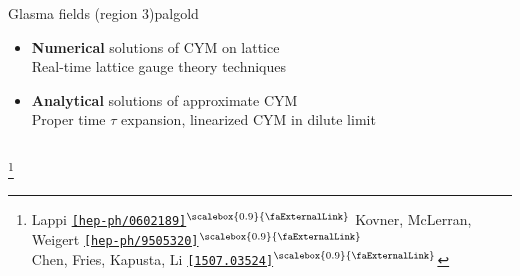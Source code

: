 \documentclass[aspectratio=169,11pt,usenames,dvipsnames]{beamer}
\renewcommand{\thefootnote}{\color{customblue}\faPaperPlaneO}
\newcommand\blfootnote[1]{%
  \begingroup
  \renewcommand\thefootnote{}\footnote{#1}%
  \addtocounter{footnote}{-1}%
  \endgroup
}
\begin{document}
\begin{frame}
\begin{columns}[onlytextwidth,t]
        \begin{custombox2}{{\normalsize Glasma fields} {\tiny (region 3)}}{palgold}
            \small
            \begin{varwidth}{0.93\textwidth}
            \begin{itemize}\itemsep0em 
                \footnotesize
                \item {\bfseries Numerical} solutions of CYM on lattice \\
                {\tiny\color{lightgray} Real-time lattice gauge theory techniques}
                \item {\bfseries Analytical} solutions of approximate CYM \\
                {\tiny\color{lightgray} Proper time $\tau$ expansion, linearized CYM in dilute limit}
            \end{itemize}
            \end{varwidth}
        \end{custombox2}
    \end{columns}
    \vspace{-10pt}
    \blfootnote{\scriptsize Lappi \href{https://arxiv.org/abs/hep-ph/0602189}{{\color{palgold}\texttt{[hep-ph/0602189]}$^\text{\scalebox{0.9}{\faExternalLink}}$}} Kovner, McLerran, Weigert \href{https://arxiv.org/abs/hep-ph/9505320}{{\color{palgold}\texttt{[hep-ph/9505320]}$^\text{\scalebox{0.9}{\faExternalLink}}$}}\\
    \hspace{13.5pt} Chen, Fries, Kapusta, Li \href{https://arxiv.org/abs/1507.03524}{{\color{palgold}\texttt{[1507.03524]}$^\text{\scalebox{0.9}{\faExternalLink}}$}} }
\end{frame}

\end{document}

